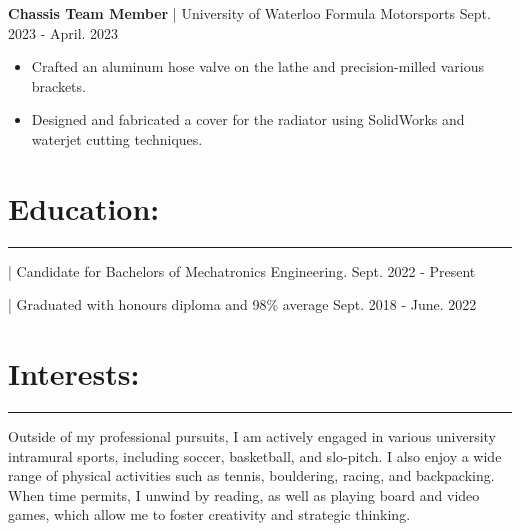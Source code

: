 \documentclass{article}
\begin{document}
\textbf{\hspace{-0.10cm} Chassis Team Member} | University of Waterloo Formula Motorsports \hspace{3.3cm} {\small Sept. 2023 - April. 2023}

\vspace{-0.2cm}
\begin{itemize}[leftmargin=1.5cm]
    \item Crafted an aluminum hose valve on the lathe and precision-milled various brackets.


    \vspace{-0.1cm}

    \item Designed and fabricated a cover for the radiator using SolidWorks and waterjet cutting techniques.
\end{itemize}



\vspace{-0.5cm}
\section*{\hspace{0.4cm} \large Education:}
\begin{center}
    \vspace{-0.5cm}
    \rule{\textwidth}{0.1pt}
\end{center}


\begin{description}
    \vspace{-0.5cm}
    \item[\hspace{0.6cm}University of Waterloo] | Candidate for Bachelors of Mechatronics Engineering. \hspace{2.3cm} {\small Sept. 2022 - Present}
    \vspace{-0.2cm}
    \item[\hspace{0.6cm}Secondary School ] | Graduated with honours diploma and 98\% average \hspace{3.1cm} {\small Sept. 2018 - June. 2022}
\end{description}



\vspace{-0.5cm}     
\section*{\hspace{0.4cm} \large Interests:}
\begin{center}
    \vspace{-0.5cm}
    \rule{\textwidth}{0.1pt}
\end{center}
    Outside of my professional pursuits, I am actively engaged in various university intramural sports, including soccer, basketball, and slo-pitch. I also enjoy a wide range of physical activities such as tennis, bouldering, racing, and backpacking. When time permits, I unwind by reading, as well as playing board and video games, which allow me to foster creativity and strategic thinking.
\end{document}
